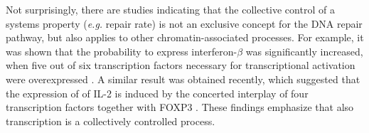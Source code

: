 Not surprisingly, there are studies indicating that the collective control of a systems property (\textit{e.g.} repair rate) is not an exclusive concept for the DNA repair pathway, but also applies to other chromatin-associated processes. For example, it was shown that the probability to express interferon-$\beta$ was significantly increased, when five out of six transcription factors necessary for transcriptional activation were overexpressed \cite{Apostolou2008}. A similar result was obtained recently, which suggested that the expression of of IL-2 is induced by the concerted interplay of four transcription factors together with FOXP3 \cite{Bendfeldt2012}. These findings emphasize that also transcription is a collectively controlled process.   

%
%

